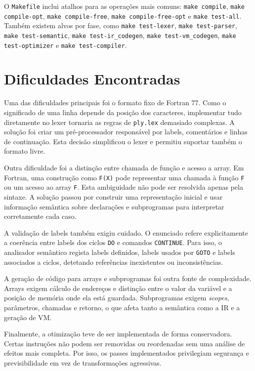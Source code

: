 \documentclass[11pt,a4paper]{report}
\begin{document}
O \texttt{Makefile} inclui atalhos para as operações mais comuns: \texttt{make compile}, \texttt{make compile-opt}, \texttt{make compile-free}, \texttt{make compile-free-opt} e \texttt{make test-all}. Também existem alvos por fase, como \texttt{make test-lexer}, \texttt{make test-parser}, \texttt{make test-semantic}, \texttt{make test-ir\_codegen}, \texttt{make test-vm\_codegen}, \texttt{make test-optimizer} e \texttt{make test-compiler}.


\section{Dificuldades Encontradas}

Uma das dificuldades principais foi o formato fixo de Fortran 77. Como o significado de uma linha depende da posição dos caracteres, implementar tudo diretamente no lexer tornaria as regras de \texttt{ply.lex} demasiado complexas. A solução foi criar um pré-processador responsável por labels, comentários e linhas de continuação. Esta decisão simplificou o lexer e permitiu suportar também o formato livre.


Outra dificuldade foi a distinção entre chamada de função e acesso a array. Em Fortran, uma construção como \texttt{F(X)} pode representar uma chamada à função \texttt{F} ou um acesso ao array \texttt{F}. Esta ambiguidade não pode ser resolvida apenas pela sintaxe. A solução passou por construir uma representação inicial e usar informação semântica sobre declarações e subprogramas para interpretar corretamente cada caso.


A validação de labels também exigiu cuidado. O enunciado refere explicitamente a coerência entre labels dos ciclos \texttt{DO} e comandos \texttt{CONTINUE}. Para isso, o analisador semântico regista labels definidos, labels usados por \texttt{GOTO} e labels associados a ciclos, detetando referências inexistentes ou inconsistências.


A geração de código para arrays e subprogramas foi outra fonte de complexidade. Arrays exigem cálculo de endereços e distinção entre o valor da variável e a posição de memória onde ela está guardada. Subprogramas exigem \textit{scopes}, parâmetros, chamadas e retorno, o que afeta tanto a semântica como a IR e a geração de VM.

Finalmente, a otimização teve de ser implementada de forma conservadora. Certas instruções não podem ser removidas ou reordenadas sem uma análise de efeitos mais completa. Por isso, os passes implementados privilegiam segurança e previsibilidade em vez de transformações agressivas.
\end{document}
